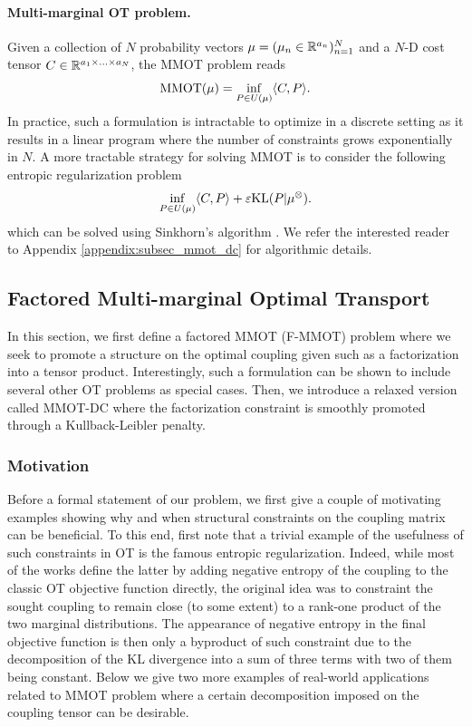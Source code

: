 \paragraph{Multi-marginal OT problem.} Given a collection of $N$ probability vectors $\mu = (\mu_n \in \mathbb R^{a_n})_{n=1}^N$
and a $N$-D cost tensor $C \in \mathbb R^{a_1 \times ... \times a_N}$, the MMOT problem reads
\begin{equation*}
  \text{MMOT}(\mu) = \inf_{P \in U(\mu)} \langle C, P \rangle.
\end{equation*}
In practice, such a formulation is intractable to optimize in a discrete setting as it results in a linear program where the number
of constraints grows exponentially in $N$. A more tractable strategy for solving MMOT is to consider the following entropic
regularization problem
\begin{equation} \label{MMOT_primal}
  \inf_{P \in U(\mu)} \langle C, P \rangle + \varepsilon \text{KL}(P | \mu^{\otimes}).
\end{equation}
which can be solved using Sinkhorn's algorithm \citep{Benamou14}.
We refer the interested reader to Appendix \ref{appendix:subsec_mmot_dc} for algorithmic details.

\subsection{Factored Multi-marginal Optimal Transport}

In this section, we first define a factored MMOT (F-MMOT) problem where we seek to promote a structure on the optimal coupling
given such as a factorization into a tensor product. Interestingly, such a formulation can be shown to include several other
OT problems as special cases. Then, we introduce a relaxed version called MMOT-DC where the factorization constraint is
smoothly promoted through a Kullback-Leibler penalty.

\subsubsection{Motivation}

Before a formal statement of our problem, we first give a couple of motivating examples showing
why and when structural constraints on the coupling matrix can be beneficial. To this end,
first note that a trivial example of the usefulness of such constraints in OT is the famous
entropic regularization. Indeed, while most of the works define the latter by adding
negative entropy of the coupling to the classic OT objective function directly,
the original idea was to constraint the sought coupling to remain close (to some extent)
to a rank-one product of the two marginal distributions. The appearance of negative entropy
in the final objective function is then only a byproduct of such constraint due to
the decomposition of the KL divergence into a sum of three terms with two of them being constant.
Below we give two more examples of real-world applications related to MMOT problem
where a certain decomposition imposed on the coupling tensor can be desirable.
